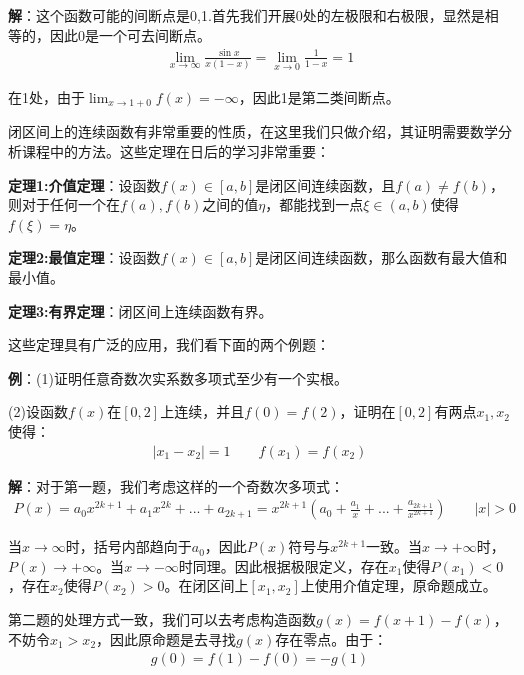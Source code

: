 \documentclass{ctexart}
\let\oldtextbf\textbf %
\renewcommand{\textbf}[1]{\textcolor{btex}{\oldtextbf{#1}}} %
\begin{document}
\textbf{\color{btex}解}：这个函数可能的间断点是0,1.首先我们开展0处的左极限和右极限，显然是相等的，因此0是一个可去间断点。
\begin{align*}
    \lim_{x\to\infty}\frac{\sin x}{x(1-x)}=\lim_{x\to 0}\frac{1}{1-x}=1
\end{align*}

在1处，由于$\lim_{x\to1+0}f(x)=-\infty$，因此1是第二类间断点。

闭区间上的连续函数有非常重要的性质，在这里我们只做介绍，其证明需要数学分析课程中的方法。这些定理在日后的学习非常重要：
\begin{tcolorbox}[
    colback=bac2,     %
    colframe=fra2,   %
    coltitle=white,             %
    coltext=tex2,
    title=闭区间连续函数的性质,
    fonttitle=\bfseries,        %
arc=3mm,                     %
breakable
]
\textbf{\color{btex}定理1:介值定理}：设函数$f(x)\in[a,b]$是闭区间连续函数，且$f(a)\neq f(b)$，则对于任何一个在$f(a),f(b)$之间的值$\eta$，都能找到一点$\xi \in(a,b)$使得$f(\xi)=\eta$。

\textbf{\color{btex}定理2:最值定理}：设函数$f(x)\in[a,b]$是闭区间连续函数，那么函数有最大值和最小值。

\textbf{\color{btex}定理3:有界定理}：闭区间上连续函数有界。
\end{tcolorbox}

这些定理具有广泛的应用，我们看下面的两个例题：

\textbf{\color{btex}例}：(1)证明任意奇数次实系数多项式至少有一个实根。

(2)设函数$f(x)$在$[0,2]$上连续，并且$f(0)=f(2)$，证明在$[0,2]$有两点$x_1,x_2$使得：
\begin{align*}
    |x_1-x_2|=1\qquad f(x_1)=f(x_2)
\end{align*}

\textbf{\color{btex}解}：对于第一题，我们考虑这样的一个奇数次多项式：
\begin{align*}
    P(x)=a_0x^{2k+1}+a_1x^{2k}+...+a_{2k+1}=x^{2k+1}(a_0+\frac{a_1}{x}+...+\frac{a_{2k+1}}{x^{2k+1}})\qquad |x|>0
\end{align*}

当$x\to\infty$时，括号内部趋向于$a_0$，因此$P(x)$符号与$x^{2k+1}$一致。当$x\to+\infty$时，$P(x)\to+\infty$。当$x\to -\infty$时同理。因此根据极限定义，存在$x_1$使得$P(x_1)<0$，存在$x_2$使得$P(x_2)>0$。在闭区间上$[x_1,x_2]$上使用介值定理，原命题成立。

第二题的处理方式一致，我们可以去考虑构造函数$g(x)=f(x+1)-f(x)$，不妨令$x_1>x
_2$，因此原命题是去寻找$g(x)$存在零点。由于：
\begin{align*}
    g(0)=f(1)-f(0)=-g(1)
\end{align*}
\end{document}
